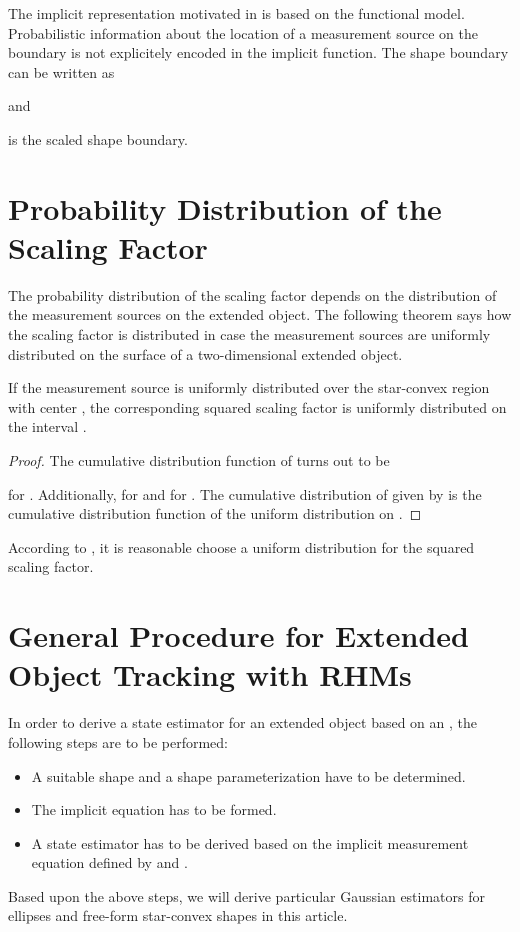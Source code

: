 \documentclass[preprint,1p,11pt]{ISAS_IR}
\begin{document}
 \begin{Remark} The implicit representation motivated in  is based on  the functional model. Probabilistic information about the location of a  measurement source on the boundary is not explicitely encoded in the implicit function.
  The shape boundary can be written as
 
     and
     
   is the scaled shape boundary.
  \end{Remark}

 
 




\section{Probability Distribution of the Scaling Factor} 
The probability distribution of the scaling factor depends on the distribution of the measurement sources on the extended object.
The following theorem  says how the scaling factor is distributed in case the measurement sources are uniformly distributed on the surface of a two-dimensional extended object.
 

 \begin{Theorem}\label{theo:uniform} 
If  the   measurement source  is uniformly distributed over the    star-convex region  with center , the corresponding squared scaling factor 
  is uniformly distributed on the interval .
 \end{Theorem}
 \begin{proof}
The cumulative  distribution function  of  turns out  to be

for . Additionally,     for  and  for . The cumulative distribution of   given by     is the cumulative  distribution function of the uniform distribution on .
\end{proof}
According to , it is reasonable choose a uniform distribution for the squared scaling factor.

\section{General Procedure for Extended Object Tracking with RHMs}\label{sec:general}
In order to derive a state estimator for an extended object based on an \rhm , the following steps are to be performed:
\begin{itemize}
 \item A suitable shape and a shape parameterization have to be determined.
  \item The implicit equation  has to be formed. 
   \item  A  state estimator has to be derived based on the implicit measurement equation defined by   and .
\end{itemize}
Based upon the above steps, we will derive  particular Gaussian estimators for ellipses and free-form star-convex shapes in this article.
\end{document}
